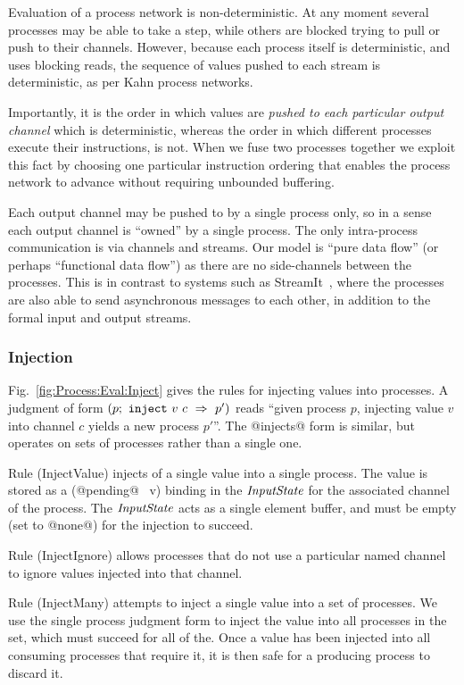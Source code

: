 Evaluation of a process network is non-deterministic. At any moment several processes may be able to take a step, while others are blocked trying to pull or push to their channels. However, because each process itself is deterministic, and uses blocking reads, the sequence of values pushed to each stream is deterministic, as per Kahn process networks. 

Importantly, it is the order in which values are \emph{pushed to each particular output channel} which is deterministic, whereas the order in which different processes execute their instructions, is not. When we fuse two processes together we exploit this fact by choosing one particular instruction ordering that enables the process network to advance without requiring unbounded buffering.

Each output channel may be pushed to by a single process only, so in a sense each output channel is ``owned'' by a single process. The only intra-process communication is via channels and streams. Our model is ``pure data flow'' (or perhaps ``functional data flow'') as there are no side-channels between the processes. This is in contrast to systems such as StreamIt~\cite{thies2002streamit}, where the processes are also able to send asynchronous messages to each other, in addition to the formal input and output streams.



\subsubsection{Injection}
Fig.~\ref{fig:Process:Eval:Inject} gives the rules for injecting values into processes. A judgment of form $(p;~\texttt{inject}~v~c~\Rightarrow~p')$ reads ``given process $p$, injecting value $v$ into channel $c$ yields a new process $p'$''. The @injects@ form is similar, but operates on sets of processes rather than a single one.

Rule (InjectValue) injects of a single value into a single process. The value is stored as a (@pending@~ v) binding in the $\textit{InputState}$ for the associated channel of the process. The $\textit{InputState}$ acts as a single element buffer, and must be empty (set to @none@) for the injection to succeed.

Rule (InjectIgnore) allows processes that do not use a particular named channel to ignore values injected into that channel.

Rule (InjectMany) attempts to inject a single value into a set of processes. We use the single process judgment form to inject the value into all processes in the set, which must succeed for all of the. Once a value has been injected into all consuming processes that require it, it is then safe for a producing process to discard it.

